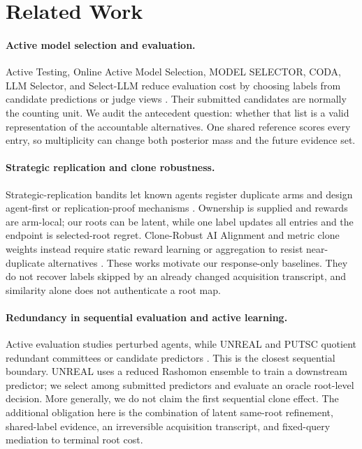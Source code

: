 \section{Related Work}
\label{sec:related}

\paragraph{Active model selection and evaluation.}
Active Testing, Online Active Model Selection, MODEL SELECTOR, CODA, LLM Selector, and Select-LLM reduce evaluation cost by choosing labels from candidate predictions or judge views \citep{kossen2021activetesting,rezakarimi2021onlineams,okanovic2025modelselector,kay2025coda,durmazkeser2025llmselector,durmazkeser2026selectllm}. Their submitted candidates are normally the counting unit. We audit the antecedent question: whether that list is a valid representation of the accountable alternatives. One shared reference scores every entry, so multiplicity can change both posterior mass and the future evidence set.

\paragraph{Strategic replication and clone robustness.}
Strategic-replication bandits let known agents register duplicate arms and design agent-first or replication-proof mechanisms \citep{shin2022strategicreplication,shin2025replicationproof}. Ownership is supplied and rewards are arm-local; our roots can be latent, while one label updates all entries and the endpoint is selected-root regret. Clone-Robust AI Alignment and metric clone weights instead require static reward learning or aggregation to resist near-duplicate alternatives \citep{procaccia2025clonerobust,berriaud2026clone,berriaud2026consensus}. These works motivate our response-only baselines. They do not recover labels skipped by an already changed acquisition transcript, and similarity alone does not authenticate a root map.

\paragraph{Redundancy in sequential evaluation and active learning.}
Active evaluation studies perturbed agents, while UNREAL and PUTSC quotient redundant committees or candidate predictors \citep{lanctot2026activeevaluation,nguyen2025unreal,liang2020putsc}. This is the closest sequential boundary. UNREAL uses a reduced Rashomon ensemble to train a downstream predictor; we select among submitted predictors and evaluate an oracle root-level decision. More generally, we do not claim the first sequential clone effect. The additional obligation here is the combination of latent same-root refinement, shared-label evidence, an irreversible acquisition transcript, and fixed-query mediation to terminal root cost.

